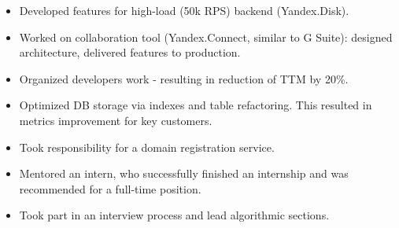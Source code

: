 \begin{itemize}
    \item Developed features for high-load (50k RPS) backend (Yandex.Disk).
    \item Worked on collaboration tool (Yandex.Connect, similar to G Suite): designed architecture, delivered features to production.
    \item Organized developers work - resulting in reduction of TTM by 20\%.
    \item Optimized DB storage via indexes and table refactoring.
    This resulted in metrics improvement for key customers.
    \item Took responsibility for a domain registration service.
    \item Mentored an intern, who successfully finished an internship and was recommended for a full-time position.
    \item Took part in an interview process and lead algorithmic sections.
\end{itemize}
